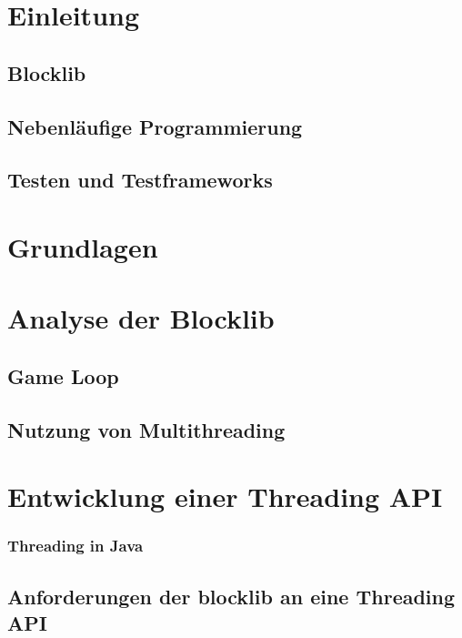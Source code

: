 \documentclass[12pt,a4paper,listof=totocnumbered,parskip=half]{scrreprt}
\begin{document}

\null\thispagestyle{empty}\clearpage
\tableofcontents
\chapter{Einleitung}
\section{Blocklib}
\section{Nebenläufige Programmierung}
\section{Testen und Testframeworks}

\chapter{Grundlagen}



\chapter{Analyse der Blocklib}

\section{Game Loop}

\section{Nutzung von Multithreading}



\chapter{Entwicklung einer Threading API}


\subsection{Threading in Java}

\section{Anforderungen der blocklib an eine Threading API}
\end{document}
